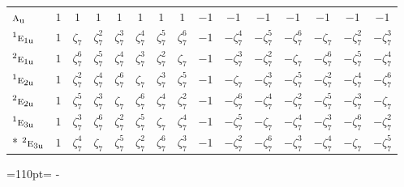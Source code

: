 \documentclass[10pt,a4paper]{article}
\newcommand{\needspace}[1]{\par\penalty-100\begingroup\dimen0=#1\relax\dimen2=\pagegoal
  \advance\dimen2-\pagetotal\ifdim\dimen0>\dimen2\relax\ifdim\dimen2>0pt\vfil\break\fi\fi
  \endgroup}
\numberwithin{equation}{section}
\newcommand{\irr}[1]{\text{\normalfont\scshape #1}}
\newcommand{\conjpair}[1]{{}^{#1}}
\newcommand{\ptag}[1]{\mathrm{#1}}
\newcommand{\rootunity}[1]{\zeta_{#1}}
\begin{document}
{\begin{longtable}{@{}lcccccccccccccc@{}}
$\irr{a}_{\ptag{u}}$ & $1$ & $1$ & $1$ & $1$ & $1$ & $1$ & $1$ & $-1$ & $-1$ & $-1$ & $-1$ & $-1$ & $-1$ & $-1$\\
$\conjpair{1}\irr{e}_{1\ptag{u}}$ & $1$ & $\rootunity{7}$ & $\rootunity{7}^{2}$ & $\rootunity{7}^{3}$ & $\rootunity{7}^{4}$ & $\rootunity{7}^{5}$ & $\rootunity{7}^{6}$ & $-1$ & $-\rootunity{7}^{4}$ & $-\rootunity{7}^{5}$ & $-\rootunity{7}^{6}$ & $-\rootunity{7}$ & $-\rootunity{7}^{2}$ & $-\rootunity{7}^{3}$\\
$\conjpair{2}\irr{e}_{1\ptag{u}}$ & $1$ & $\rootunity{7}^{6}$ & $\rootunity{7}^{5}$ & $\rootunity{7}^{4}$ & $\rootunity{7}^{3}$ & $\rootunity{7}^{2}$ & $\rootunity{7}$ & $-1$ & $-\rootunity{7}^{3}$ & $-\rootunity{7}^{2}$ & $-\rootunity{7}$ & $-\rootunity{7}^{6}$ & $-\rootunity{7}^{5}$ & $-\rootunity{7}^{4}$\\
$\conjpair{1}\irr{e}_{2\ptag{u}}$ & $1$ & $\rootunity{7}^{2}$ & $\rootunity{7}^{4}$ & $\rootunity{7}^{6}$ & $\rootunity{7}$ & $\rootunity{7}^{3}$ & $\rootunity{7}^{5}$ & $-1$ & $-\rootunity{7}$ & $-\rootunity{7}^{3}$ & $-\rootunity{7}^{5}$ & $-\rootunity{7}^{2}$ & $-\rootunity{7}^{4}$ & $-\rootunity{7}^{6}$\\
$\conjpair{2}\irr{e}_{2\ptag{u}}$ & $1$ & $\rootunity{7}^{5}$ & $\rootunity{7}^{3}$ & $\rootunity{7}$ & $\rootunity{7}^{6}$ & $\rootunity{7}^{4}$ & $\rootunity{7}^{2}$ & $-1$ & $-\rootunity{7}^{6}$ & $-\rootunity{7}^{4}$ & $-\rootunity{7}^{2}$ & $-\rootunity{7}^{5}$ & $-\rootunity{7}^{3}$ & $-\rootunity{7}$\\
$\conjpair{1}\irr{e}_{3\ptag{u}}$ & $1$ & $\rootunity{7}^{3}$ & $\rootunity{7}^{6}$ & $\rootunity{7}^{2}$ & $\rootunity{7}^{5}$ & $\rootunity{7}$ & $\rootunity{7}^{4}$ & $-1$ & $-\rootunity{7}^{5}$ & $-\rootunity{7}$ & $-\rootunity{7}^{4}$ & $-\rootunity{7}^{3}$ & $-\rootunity{7}^{6}$ & $-\rootunity{7}^{2}$\\*
$\conjpair{2}\irr{e}_{3\ptag{u}}$ & $1$ & $\rootunity{7}^{4}$ & $\rootunity{7}$ & $\rootunity{7}^{5}$ & $\rootunity{7}^{2}$ & $\rootunity{7}^{6}$ & $\rootunity{7}^{3}$ & $-1$ & $-\rootunity{7}^{2}$ & $-\rootunity{7}^{6}$ & $-\rootunity{7}^{3}$ & $-\rootunity{7}^{4}$ & $-\rootunity{7}$ & $-\rootunity{7}^{5}$\\
\bottomrule\end{longtable}}
\needspace{110pt}
\end{document}
